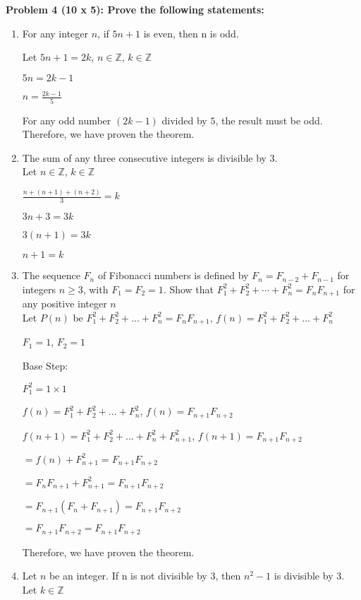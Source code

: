 \documentclass[12pt,twoside]{article}
\begin{document}

\textbf{Problem 4 (10 x 5): Prove the following statements:}
\begin{enumerate}
    \item For any integer $n$, if $5n+1$ is even, then n is odd.

	Let $5n + 1 = 2k$, $n \in \mathbb{Z}$, $k \in \mathbb{Z}$

	$5n = 2k - 1$

	$n = \frac{2k - 1}{5}$

	For any odd number $(2k - 1)$ divided by $5$, the result must be odd. Therefore, we have proven the theorem.

    \newpage
    \item The sum of any three consecutive integers is divisible by 3.\\

	Let $n \in \mathbb{Z}$, $k \in \mathbb{Z}$

	$\frac{n + (n + 1) + (n + 2)}{3} = k$

	$3n + 3 = 3k$

	$3(n + 1) = 3k$

	$n + 1 = k$

    \newpage
    \item The sequence $F_n$ of Fibonacci numbers is defined by $F_{n} = F_{n-2} + F_{n-1}$ for integers $n \geq 3$, with $F_1=F_2=1$. Show that $F_1^2 + F_2^2 +\cdots +F_{n}^2 =  F_nF_{n+1}$ for any positive integer $n$ \\
	Let $P(n)$ be $F_1^2 + F_2^2 + ... + F_n^2 = F_n F_{n+1}$, $f(n) = F_1^2 + F_2^2 + ... + F_n^2$

	$F_1 = 1$, $F_2 = 1$

	Base Step:

	$F_1^2 = 1 \times 1$

	$f(n) = F_1^2 + F_2^2 + ... + F_n^2$, $f(n) = F_{n+1}F_{n+2}$

	$f(n + 1) = F_1^2 + F_2^2 + ... + F_n^2 + F_{n+1}^2$, $f(n+1) = F_{n+1}F_{n+2}$

	$= f(n) + F_{n+1}^2 = F_{n+1}F_{n+2}$

	$= F_{n}F_{n+1} + F_{n+1}^2 = F_{n+1}F_{n+2}$

	$= F_{n+1}(F_n + F_{n+1}) = F_{n+1}F_{n+2}$

	$= F_{n+1}F_{n+2} = F_{n+1}F_{n+2}$

	Therefore, we have proven the theorem.

    \newpage
    \item Let $n$ be an integer. If n is not divisible by 3, then $n^2 -1$ is divisible by 3.\\
	Let $k \in \mathbb{Z}$


\end{enumerate}
\end{document}
